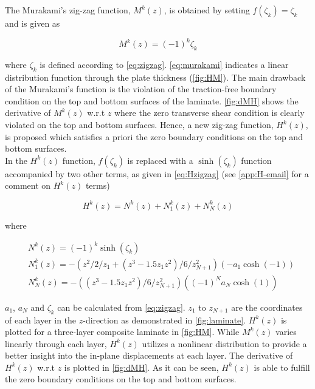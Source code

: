 \documentclass{article}
\begin{document}
The Murakami's zig-zag function, $M^k(z)$, is obtained by setting $f(\zeta_k)=\zeta_k$ and is given as

\begin{equation}
    M^k(z) = (-1)^k \zeta_k
    \label{eq:murakami}
\end{equation}

where $\zeta_k$ is defined according to \cref{eq:zigzag}. \cref{eq:murakami} indicates a linear distribution function through the plate thickness (\cref{fig:HM}). The main drawback of the Murakami's function is the violation of the traction-free boundary condition on the top and bottom surfaces of the laminate. \cref{fig:dMH} shows the derivative of $M^k(z)$ w.r.t $z$ where the zero transverse shear condition is clearly violated on the top and bottom surfaces. Hence, a new zig-zag function, $H^k(z)$, is proposed which satisfies a priori the zero boundary conditions on the top and bottom surfaces. \\

In the $H^k(z)$ function, $f(\zeta_k)$ is replaced with a $\sinh(\zeta_k)$ function accompanied by two other terms, as given in \cref{eq:Hzigzag} (see \cref{app:H-email} for a comment on $H^k(z)$ terms)

\begin{equation}
    H^k(z) = N^k(z) + N^k_1(z) + N^k_N(z)
    \label{eq:Hzigzag}
\end{equation}

where

\begin{align*}
    & N^k(z) = (-1)^k \sinh(\zeta_k) \\
    & N^k_1(z) = -(z^2 / 2 / z_1 + (z^3 -1.5z_1 z^2) / 6 / z^2_{N+1})(-a_1\cosh(-1)) \\
    & N^k_N(z) = -((z^3 - 1.5z_1 z^2) / 6 / z^2_{N+1})((-1)^N a_N \cosh(1))
\end{align*}

$a_1$, $a_N$ and $\zeta_k$ can be calculated from \cref{eq:zigzag}. $z_1$ to $z_{N+1}$ are the coordinates of each layer in the $z$-direction as demonstrated in \cref{fig:laminate}. $H^k(z)$ is plotted for a three-layer composite laminate in \cref{fig:HM}. While $M^k(z)$ varies linearly through each layer, $H^k(z)$ utilizes a nonlinear distribution to provide a better insight into the in-plane displacements at each layer. The derivative of $H^k(z)$ w.r.t $z$ is plotted in \cref{fig:dMH}. As it can be seen, $H^k(z)$ is able to fulfill the zero boundary conditions on the top and bottom surfaces.
\end{document}
